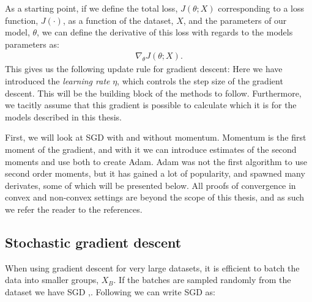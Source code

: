 As a starting point, if we define the total loss, $J(\theta;X)$ corresponding to a loss function, $J(\cdot)$, as a function of the dataset, $X$, and the parameters of our model, $\theta$, we can define the derivative of this loss with regards to the models parameters as:
\begin{align}
	\nabla_\theta J(\theta;X).
\end{align}
This gives us the following update rule for gradient descent: %
Here we have introduced the \textit{learning rate} $\eta$, which controls the step size of the gradient descent.
This will be the building block of the methods to follow. 
Furthermore, we tacitly assume that this gradient is possible to calculate which it is for the models described in this thesis.

First, we will look at \ac{SGD} with and without momentum. 
Momentum is the first moment of the gradient, and with it we can introduce estimates of the second moments and use both to create \ac{Adam}. 
\ac{Adam} was not the first algorithm to use second order moments, but it has gained a lot of popularity, and spawned many derivates, some of which will be presented below.
All proofs of convergence in convex and non-convex settings are beyond the scope of this thesis, and as such we refer the reader to the references. 
\subsection{Stochastic gradient descent}
When using gradient descent for very large datasets, it is efficient to batch the data into smaller groups, $X_B$. If the batches are sampled randomly from the dataset we have \ac{SGD} \cite{robbinsStochasticApproximationMethod2007},\cite{kieferStochasticEstimationMaximum1952}. 
Following \cite{ruderOverviewGradientDescent2017} we can write \ac{SGD} as:
